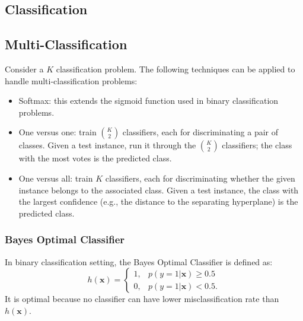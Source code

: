 \subsection{Classification}
        \subsection{Multi-Classification}
            Consider a $K$ classification problem.
            The following techniques can be applied to handle multi-classification problems:
            \begin{itemize}
                \item Softmax: this extends the sigmoid function used in binary classification problems.
                \item One versus one: train  $\binom{K}{2}$ classifiers, each for discriminating a pair of classes.
                Given a test instance, run it through the $\binom{K}{2}$ classifiers; the class with the most votes is the predicted class.
                \item One versus all: train $K$ classifiers, each for discriminating whether the given instance belongs to the associated class.
                Given a test instance, the class with the largest confidence (e.g., the distance to the separating hyperplane) is the predicted class.
            \end{itemize}
            
        \subsubsection{Bayes Optimal Classifier}
            In binary classification setting, the Bayes Optimal Classifier is defined as:
                \begin{equation}
                    h(\bm{x}) = \begin{cases} 1, & p(y=1 | \bm{x}) \ge 0.5 \\
                                              0, & p(y=1 | \bm{x}) < 0.5.
                    \end{cases}
                \end{equation}      
            It is optimal because no classifier can have lower misclassification rate than $h(\bm{x})$.
